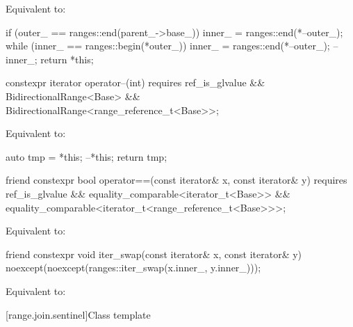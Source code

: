\begin{itemdescr}
\pnum
\effects Equivalent to:
\begin{codeblock}
if (outer_ == ranges::end(parent_->base_))
  inner_ = ranges::end(*--outer_);
while (inner_ == ranges::begin(*outer_))
  inner_ = ranges::end(*--outer_);
--inner_;
return *this;
\end{codeblock}
\end{itemdescr}

\begin{itemdecl}
constexpr iterator operator--(int)
  requires ref_is_glvalue && BidirectionalRange<Base> &&
           BidirectionalRange<range_reference_t<Base>>;
\end{itemdecl}

\begin{itemdescr}
\pnum
\effects Equivalent to:
\begin{codeblock}
auto tmp = *this;
--*this;
return tmp;
\end{codeblock}
\end{itemdescr}

\begin{itemdecl}
friend constexpr bool operator==(const iterator& x, const iterator& y)
  requires ref_is_glvalue && equality_comparable<iterator_t<Base>> &&
           equality_comparable<iterator_t<range_reference_t<Base>>>;
\end{itemdecl}

\begin{itemdescr}
\pnum
\effects Equivalent to:
\end{itemdescr}

\begin{itemdecl}
friend constexpr void iter_swap(const iterator& x, const iterator& y)
  noexcept(noexcept(ranges::iter_swap(x.inner_, y.inner_)));
\end{itemdecl}

\begin{itemdescr}
\pnum
\effects Equivalent to: 
\end{itemdescr}

[range.join.sentinel]{Class template }

